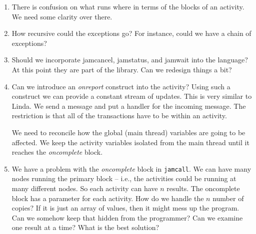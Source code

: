 \documentclass[11pt]{article}
\begin{document}
\begin{enumerate}
    \item
    There is confusion on what runs where in terms of the blocks of an activity.
    We need some clarity over there.

    \item
    How recursive could the exceptions go? For instance, could we have a chain of exceptions?

    \item
    Should we incorporate jamcancel, jamstatus, and jamwait into the language?
    At this point they are part of the library. Can we redesign things a bit?

    \item
    Can we introduce an {\em onreport} construct into the activity? Using such a
    construct we can provide a constant stream of updates. This is very similar to
    Linda. We send a message and put a handler for the incoming message. The restriction
    is that all of the transactions have to be within an activity.

    We need to reconcile how the global (main thread) variables are going to be affected.
    We keep the activity variables isolated from the main thread until it
    reaches the {\em oncomplete} block.

    \item
    We have a problem with the {\em oncomplete} block in {\tt jamcall}. We can have many
    nodes running the primary block -- i.e., the activities could be running at many different
    nodes. So each activity can have $n$ results. The oncomplete block has a parameter for each
    activity. How do we handle the $n$ number of copies? If it is just an array of values, then
    it might mess up the program. Can we somehow keep that hidden from the programmer?
    Can we examine one result at a time? What is the best solution?

\end{enumerate}









\end{document}
